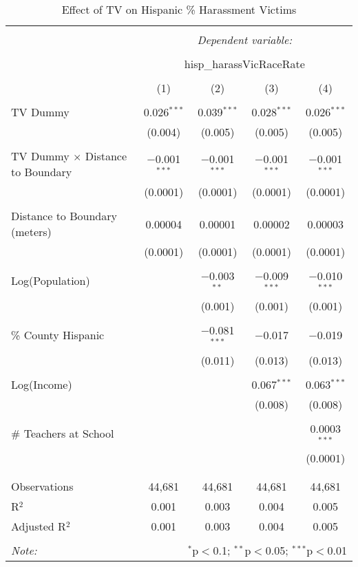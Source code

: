 
\begin{table}[!htbp] \centering 
  \caption{Effect of TV on Hispanic \% Harassment Victims} 
  \label{} 
\begin{tabular}{@{\extracolsep{-2pt}}lcccc} 
\\[-1.8ex]\hline 
\hline \\[-1.8ex] 
 & \multicolumn{4}{c}{\textit{Dependent variable:}} \\ 
\cline{2-5} 
\\[-1.8ex] & \multicolumn{4}{c}{hisp\_harassVicRaceRate} \\ 
\\[-1.8ex] & (1) & (2) & (3) & (4)\\ 
\hline \\[-1.8ex] 
 TV Dummy & 0.026$^{***}$ & 0.039$^{***}$ & 0.028$^{***}$ & 0.026$^{***}$ \\ 
  & (0.004) & (0.005) & (0.005) & (0.005) \\ 
  & & & & \\ 
 TV Dummy $\times$ Distance to Boundary & $-$0.001$^{***}$ & $-$0.001$^{***}$ & $-$0.001$^{***}$ & $-$0.001$^{***}$ \\ 
  & (0.0001) & (0.0001) & (0.0001) & (0.0001) \\ 
  & & & & \\ 
 Distance to Boundary (meters) & 0.00004 & 0.00001 & 0.00002 & 0.00003 \\ 
  & (0.0001) & (0.0001) & (0.0001) & (0.0001) \\ 
  & & & & \\ 
 Log(Population) &  & $-$0.003$^{**}$ & $-$0.009$^{***}$ & $-$0.010$^{***}$ \\ 
  &  & (0.001) & (0.001) & (0.001) \\ 
  & & & & \\ 
 \% County Hispanic &  & $-$0.081$^{***}$ & $-$0.017 & $-$0.019 \\ 
  &  & (0.011) & (0.013) & (0.013) \\ 
  & & & & \\ 
 Log(Income) &  &  & 0.067$^{***}$ & 0.063$^{***}$ \\ 
  &  &  & (0.008) & (0.008) \\ 
  & & & & \\ 
 \# Teachers at School &  &  &  & 0.0003$^{***}$ \\ 
  &  &  &  & (0.0001) \\ 
  & & & & \\ 
\hline \\[-1.8ex] 
Observations & 44,681 & 44,681 & 44,681 & 44,681 \\ 
R$^{2}$ & 0.001 & 0.003 & 0.004 & 0.005 \\ 
Adjusted R$^{2}$ & 0.001 & 0.003 & 0.004 & 0.005 \\ 
\hline 
\hline \\[-1.8ex] 
\textit{Note:}  & \multicolumn{4}{r}{$^{*}$p$<$0.1; $^{**}$p$<$0.05; $^{***}$p$<$0.01} \\ 
\end{tabular} 
\end{table} 
